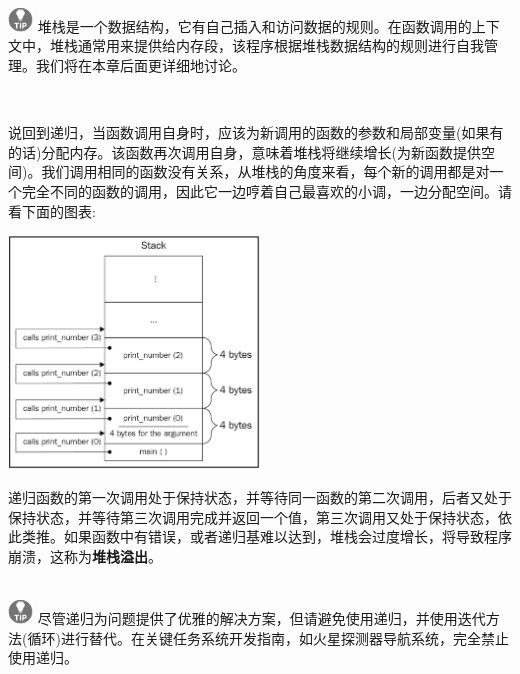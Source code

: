 \hspace*{\fill} \\ %
\includegraphics[width=0.05\textwidth]{images/tip}
堆栈是一个数据结构，它有自己插入和访问数据的规则。在函数调用的上下文中，堆栈通常用来提供给内存段，该程序根据堆栈数据结构的规则进行自我管理。我们将在本章后面更详细地讨论。 \par
\noindent\textbf{}\ \par

说回到递归，当函数调用自身时，应该为新调用的函数的参数和局部变量(如果有的话)分配内存。该函数再次调用自身，意味着堆栈将继续增长(为新函数提供空间)。我们调用相同的函数没有关系，从堆栈的角度来看，每个新的调用都是对一个完全不同的函数的调用，因此它一边哼着自己最喜欢的小调，一边分配空间。请看下面的图表: \par

\begin{center}
	\includegraphics[width=0.5\textwidth]{content/Section-1/Chapter-2/4}
\end{center}

递归函数的第一次调用处于保持状态，并等待同一函数的第二次调用，后者又处于保持状态，并等待第三次调用完成并返回一个值，第三次调用又处于保持状态，依此类推。如果函数中有错误，或者递归基难以达到，堆栈会过度增长，将导致程序崩溃，这称为\textbf{堆栈溢出}。 \par

\hspace*{\fill} \\ %
\includegraphics[width=0.05\textwidth]{images/tip}
尽管递归为问题提供了优雅的解决方案，但请避免使用递归，并使用迭代方法(循环)进行替代。在关键任务系统开发指南，如火星探测器导航系统，完全禁止使用递归。\par
\noindent\textbf{}\ \par

